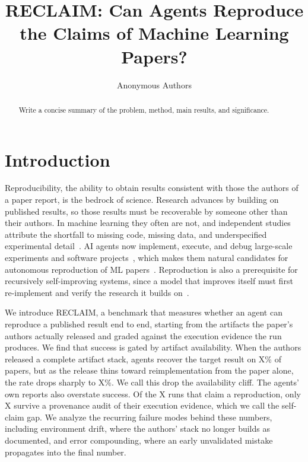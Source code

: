 \documentclass{article} %
\title{RECLAIM: Can Agents Reproduce the Claims of Machine Learning Papers?}
\author{Anonymous Authors}
\begin{document}
\maketitle

\begin{abstract}
Write a concise summary of the problem, method, main results, and significance.
\end{abstract}

\section{Introduction}
\label{sec:introduction}

Reproducibility, the ability to obtain results consistent with those the
authors of a paper report, is the bedrock of science. Research advances by
building on published results, so those results must be recoverable by
someone other than their authors. In machine learning they often are not,
and independent studies attribute the shortfall to missing code, missing
data, and underspecified experimental
detail~\citep{gundersen2018state,raff2019step,pineau2021improving,
gundersen2022sources}. AI agents now implement, execute, and debug
large-scale experiments and software
projects~\citep{jimenez2024swebench,chan2024mlebench,
merrill2026terminalbench}, which makes them natural candidates for
autonomous reproduction of ML
papers~\citep{siegel2024corebench,starace2025paperbench}. Reproduction is
also a prerequisite for recursively self-improving systems, since a model
that improves itself must first re-implement and verify the research it
builds on~\citep{favaro2026recursive}.

We introduce RECLAIM, a benchmark that measures whether an agent can
reproduce a published result end to end, starting from the artifacts the
paper's authors actually released and graded against the execution
evidence the run produces. We find that success is gated by artifact
availability. When the authors released a complete artifact stack, agents
recover the target result on X\% of papers, but as the release thins
toward reimplementation from the paper alone, the rate drops sharply to
X\%. We call this drop the availability cliff. The agents' own reports
also overstate success. Of the X runs that claim a reproduction, only X
survive a provenance audit of their execution evidence, which we call the
self-claim gap. We analyze the recurring failure modes behind these
numbers, including environment drift, where the authors' stack no longer
builds as documented, and error compounding, where an early unvalidated
mistake propagates into the final number.
\end{document}
